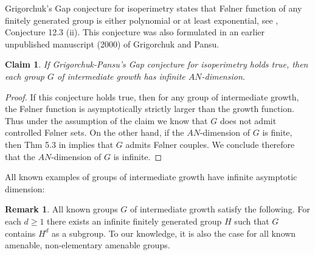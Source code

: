 \documentclass{amsart}
\numberwithin{figure}{section}
\theoremstyle{plain}
\newtheorem{claim}[thm]{Claim}
\theoremstyle{definition}
\newtheorem{rem}[thm]{Remark}
\begin{document}
Grigorchuk's Gap conjecture for isoperimetry states that	F{\o}lner function of any finitely generated group is either polynomial or at least exponential, see \cite{grigorchuksurvey}, Conjecture 12.3 (ii). This conjecture was also formulated in an earlier unpublished manuscript (2000) of Grigorchuk and Pansu. 

\begin{claim}   \label{claim:fromGrigorchuk} 
If Grigorchuk-Pansu's Gap conjecture for isoperimetry holds true, then  each group $G$ of intermediate growth has infinite $AN$-dimension.
\end{claim}
\begin{proof} 
If this conjecture holds true, then for any group  of intermediate growth, the F{\o}lner function is asymptotically strictly larger than the growth function. Thus under the assumption of the claim we know that $G$ does not admit controlled F{\o}lner sets. 
On the other hand, if the $AN$-dimension  of $G$ is finite,
then Thm 5.3 in \cite{nowak} implies that $G$ admits F{\o}lner couples. We conclude therefore that the $AN$-dimension of $G$ is infinite.
\end{proof}


All known examples of groups of intermediate growth have infinite asymptotic dimension:
\begin{rem}\label{rem:detailedintermediate}
All known groups  $G$ of intermediate growth  satisfy the following.
For each $d\ge 1$ there exists an infinite finitely generated group $H$ such that  $G$ contains
$H^d$ as a subgroup.
To our knowledge, it is also the case for all known amenable, non-elementary amenable groups.
\end{rem}
\end{document}
